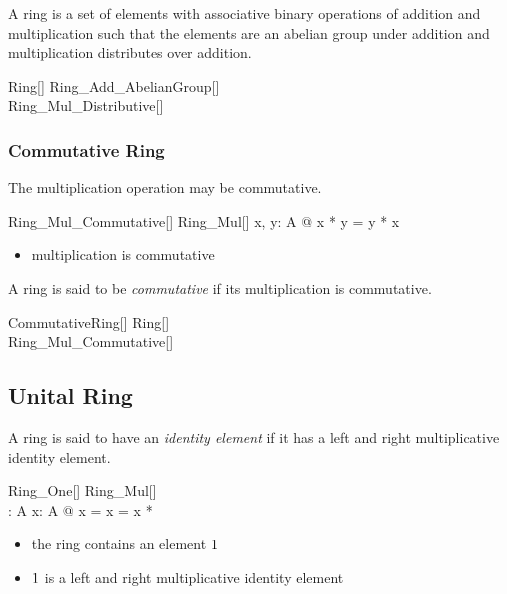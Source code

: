\documentclass{amsart}
\begin{document}
A ring is a set of elements with associative binary operations of addition and multiplication such that
the elements are an abelian group under addition and multiplication distributes over addition.

\begin{schema}{Ring}[\genT]
	Ring\_Add\_AbelianGroup[\genT] \\
	Ring\_Mul\_Distributive[\genT]
\end{schema}

\subsubsection{Commutative Ring}

The multiplication operation may be commutative.

\begin{schema}{Ring\_Mul\_Commutative}[\genT]
	Ring\_Mul[\genT]
\where
	\forall x, y: A @ x * y = y * x
\end{schema}

\begin{itemize}
	\item multiplication is commutative
\end{itemize}

A ring is said to be \textit{commutative} if its multiplication is commutative.

\begin{schema}{CommutativeRing}[\genT]
	Ring[\genT] \\
	Ring\_Mul\_Commutative[\genT]
\end{schema}

\subsection{Unital Ring}

A ring is said to have an \textit{identity element} if it has a left and right multiplicative identity element.

\begin{schema}{Ring\_One}[\genT]
	Ring\_Mul[\genT] \\
	\ringOne: \genT
\where
	\ringOne \in A
\also
	\forall x: A @ \ringOne * x = x = x * \ringOne
\end{schema}

\begin{itemize}
	\item the ring contains an element $1$
	\item $1$ is a left and right multiplicative identity element
\end{itemize}
\end{document}

